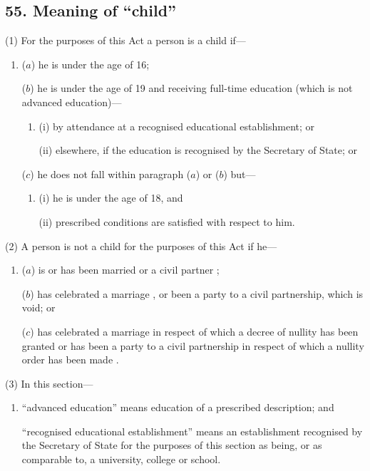 \documentclass[12pt,a4paper]{article}
\begin{document}
\subsection{55. Meaning of “child”}

(1) For the purposes of this Act a person is a child if—
\begin{enumerate}\item[]
($a$) he is under the age of 16;

($b$) he is under the age of 19 and receiving full-time education (which is not advanced education)—
\begin{enumerate}\item[]
(i) by attendance at a recognised educational establishment; or

(ii) elsewhere, if the education is recognised by the Secretary of State; or
\end{enumerate}

($c$) he does not fall within paragraph ($a$)  or ($b$)  but—
\begin{enumerate}\item[]
(i) he is under the age of 18, and

(ii) prescribed conditions are satisfied with respect to him.
\end{enumerate}
\end{enumerate}

(2) A person is not a child for the purposes of this Act if he—
\begin{enumerate}\item[]
($a$) is or has been married
or a civil partner%
;

($b$) has celebrated a marriage%
, or been a party to a civil partnership,  %
which is void; or

($c$) has celebrated a marriage in respect of which a decree of nullity has been granted
or has been a party to a civil partnership in respect of which a nullity order has been made%
.
\end{enumerate}

(3) In this section—
\begin{enumerate}\item[]
    “advanced education” means education of a prescribed description; and

    “recognised educational establishment” means an establishment recognised by the Secretary of State for the purposes of this section as being, or as comparable to, a university, college or school. 
\end{enumerate}
\end{document}
